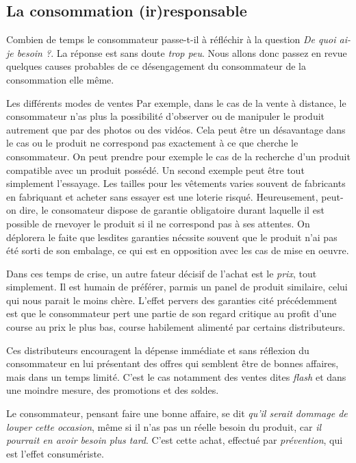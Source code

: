 \subsection{La consommation (ir)responsable}

Combien de temps le consommateur passe-t-il à réfléchir à la question \textit{De quoi ai-je besoin ?}.
La réponse est sans doute \textit{trop peu}. Nous allons donc passez en revue quelques causes probables de ce désengagement du consommateur de la consommation elle même.

\medbreak
Les différents modes de ventes 
Par exemple, dans le cas de la vente à distance, le consommateur n'as plus la possibilité d'observer ou de manipuler le produit autrement que par des photos ou des vidéos.
Cela peut être un désavantage dans le cas ou le produit ne correspond pas exactement à ce que cherche le consommateur.
\medbreak
On peut prendre pour exemple le cas de la recherche d'un produit compatible avec un produit possédé.
Un second exemple peut être tout simplement l'essayage. Les tailles pour les vêtements varies souvent de fabricants en fabriquant et acheter sans essayer est une loterie risqué.
\smallbreak
Heureusement, peut-on dire, le consomateur dispose de garantie obligatoire durant laquelle il est possible de rnevoyer le produit si il ne correspond pas à ses attentes. On déplorera le faite que lesdites garanties nécssite souvent que le produit n'ai pas été sorti de son embalage, ce qui est en opposition avec les cas de mise en oeuvre.

\medbreak
Dans ces temps de crise, un autre fateur décisif de l'achat est le \textit{prix}, tout simplement.
Il est humain de préférer, parmis un panel de produit similaire, celui qui nous parait le moins chère.
L'effet pervers des garanties cité précédemment est que le consommateur pert une partie de son regard critique au profit d'une course au prix le plus bas, course habilement alimenté par certains distributeurs.

\smallbreak
Ces distributeurs encouragent la dépense immédiate et sans réflexion du consommateur en lui présentant des offres qui semblent être de bonnes affaires, mais dans un temps limité. C'est le cas notamment des ventes dites \textit{flash} et dans une moindre mesure, des promotions et des soldes.

\smallbreak
Le consommateur, pensant faire une bonne affaire, se dit \textit{qu'il serait dommage de louper cette occasion}, même si il n'as pas un réelle besoin du produit, car \textit{il pourrait en avoir besoin plus tard}. C'est cette achat, effectué par \textit{prévention}, qui est l'effet consumériste.

